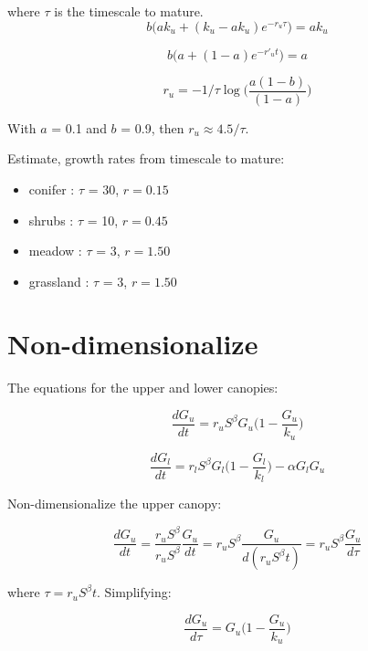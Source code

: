 \documentclass{article}
\begin{document}
where $\tau$ is the timescale to mature.
\begin{equation}
    b ({ a k_u +(k_u- a k_u) e^{-r_u \tau}) ={ a k_u }}
\end{equation}

\begin{equation}
    b ({ a  +(1- a ) e^{-r'_u t}) ={ a  }}
\end{equation}

\begin{equation}
r_u =   - 1/ \tau \log \big(\frac{a (1-b) }{(1- a )}\big)
\end{equation}


With $a$ = 0.1 and $b$ = 0.9, then $r_u \approx 4.5/ \tau$.

Estimate, growth rates from timescale to mature:

\begin{itemize}
\item conifer : $\tau$ = 30, $r=0.15$
\item shrubs : $\tau$ = 10, $r=0.45$
\item meadow : $\tau$ = 3, $r=1.50$
\item grassland : $\tau$ = 3, $r=1.50$
\end{itemize}


\section{Non-dimensionalize}

The equations for the upper and lower canopies:

\begin{equation*}
	 \frac{d G_u}{dt} =
	 r_u S^\beta G_u \bigg(1-\frac{G_u}{k_u}\bigg)
\end{equation*}


\begin{equation*}
	 \frac{d G_l}{dt} = r_l S^\beta G_l \bigg(1-\frac{G_l}{k_l}\bigg) - \alpha G_l G_u
\end{equation*}

Non-dimensionalize the upper canopy:

\begin{equation*}
    \frac{d G_u}{dt} =
     \frac{r_u S^\beta}{r_u S^\beta} \frac{G_u}{dt} =
  	{r_u S^\beta} \frac{G_u}{d(r_u S^\beta t)} =
	r_u S^\beta \frac{G_u}{d \tau}
\end{equation*}

where $\tau = r_u S^\beta t$.  Simplifying:

\begin{equation*}
    \frac{d G_u}{d\tau} =
    G_u \bigg(1-\frac{G_u}{k_u}\bigg)
\end{equation*}
\end{document}
